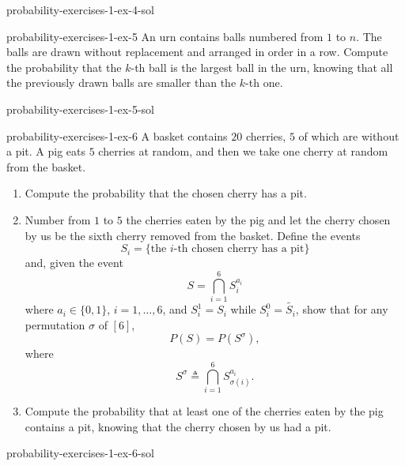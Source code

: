 \documentclass[preview]{standalone}
\begin{document}
\begin{snippetsolution}{probability-exercises-1-ex-4-sol}{}
    \todo
\end{snippetsolution}

\begin{snippetexercise}{probability-exercises-1-ex-5}{}
    An urn contains balls numbered from \(1\) to \(n\). The balls are drawn without
    replacement and arranged in order in a row. Compute the probability that the
    \(k\)-th ball is the largest ball in the urn, knowing that all the previously
    drawn balls are smaller than the \(k\)-th one.
\end{snippetexercise}

\begin{snippetsolution}{probability-exercises-1-ex-5-sol}{}
    \todo
\end{snippetsolution}

\begin{snippetexercise}{probability-exercises-1-ex-6}{}
    A basket contains \(20\) cherries, \(5\) of which are without a pit. A pig eats
    \(5\) cherries at random, and then we take one cherry at random from the basket.
    \begin{enumerate}
        \item Compute the probability that the chosen cherry has a pit.
        \item Number from \(1\) to \(5\) the cherries eaten by the pig and let the
        cherry chosen by us be the sixth cherry removed from the basket. Define the
        events
        \[
            S_i = \{\text{the \(i\)-th chosen cherry has a pit}\}
        \]
        and, given the event
        \[
            S = \bigcap_{i=1}^{6} S_i^{a_i}
        \]
        where \(a_i \in \{0,1\}\), \(i=1,\ldots,6\), and \(S_i^1 = S_i\) while
        \(S_i^0 = \widetilde{S_i}\), show that for any permutation \(\sigma\)
        of \([6]\),
        \[
            P(S) = P(S^\sigma),
        \]
        where
        \[
            S^\sigma \triangleq \bigcap_{i=1}^{6} S_{\sigma(i)}^{a_i}.
        \]
        \item Compute the probability that at least one of the cherries eaten by
        the pig contains a pit, knowing that the cherry chosen by us had a pit.
    \end{enumerate}
\end{snippetexercise}

\begin{snippetsolution}{probability-exercises-1-ex-6-sol}{}
    \todo
\end{snippetsolution}
\end{document}
